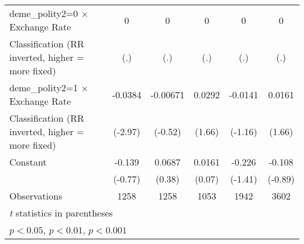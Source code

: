{\begin{tabular}{l*{5}{c}}
\addlinespace
deme\_polity2=0 $\times$ Exchange Rate   &    0         &    0         &    0         &    0         &    0         \\
Classification (RR inverted, higher = more fixed)&  (.)         &  (.)         &  (.)         &  (.)         &  (.)         \\
\addlinespace
deme\_polity2=1 $\times$ Exchange Rate   &-0.0384\sym{**} &-0.00671         &0.0292         &-0.0141         &0.0161         \\
Classification (RR inverted, higher = more fixed)&(-2.97)         &(-0.52)         &(1.66)         &(-1.16)         &(1.66)         \\
\addlinespace
Constant                                &-0.139         &0.0687         &0.0161         &-0.226         &-0.108         \\
                                        &(-0.77)         &(0.38)         &(0.07)         &(-1.41)         &(-0.89)         \\
\midrule
Observations                            & 1258         & 1258         & 1053         & 1942         & 3602         \\
\bottomrule
\multicolumn{6}{l}{\footnotesize \textit{t} statistics in parentheses}\\
\multicolumn{6}{l}{\footnotesize \sym{*} \(p<0.05\), \sym{**} \(p<0.01\), \sym{***} \(p<0.001\)}\\
\end{tabular}
}
